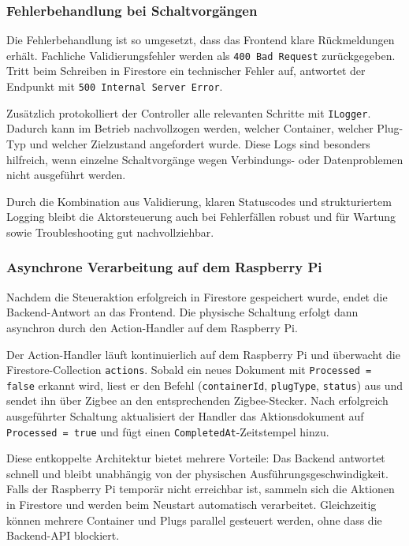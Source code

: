 \subsubsection{Fehlerbehandlung bei Schaltvorgängen}

Die Fehlerbehandlung ist so umgesetzt, dass das Frontend klare Rückmeldungen erhält. Fachliche Validierungsfehler werden als \texttt{400 Bad Request} zurückgegeben. Tritt beim Schreiben in Firestore ein technischer Fehler auf, antwortet der Endpunkt mit \texttt{500 Internal Server Error}.

Zusätzlich protokolliert der Controller alle relevanten Schritte mit \texttt{ILogger}. Dadurch kann im Betrieb nachvollzogen werden, welcher Container, welcher Plug-Typ und welcher Zielzustand angefordert wurde. Diese Logs sind besonders hilfreich, wenn einzelne Schaltvorgänge wegen Verbindungs- oder Datenproblemen nicht ausgeführt werden.

Durch die Kombination aus Validierung, klaren Statuscodes und strukturiertem Logging bleibt die Aktorsteuerung auch bei Fehlerfällen robust und für Wartung sowie Troubleshooting gut nachvollziehbar.

\subsubsection{Asynchrone Verarbeitung auf dem Raspberry Pi}

Nachdem die Steueraktion erfolgreich in Firestore gespeichert wurde, endet die Backend-Antwort an das Frontend. Die physische Schaltung erfolgt dann asynchron durch den Action-Handler auf dem Raspberry Pi.

Der Action-Handler läuft kontinuierlich auf dem Raspberry Pi und überwacht die Firestore-Collection \texttt{actions}. Sobald ein neues Dokument mit \texttt{Processed = false} erkannt wird, liest er den Befehl (\texttt{containerId}, \texttt{plugType}, \texttt{status}) aus und sendet ihn über Zigbee an den entsprechenden Zigbee-Stecker. Nach erfolgreich ausgeführter Schaltung aktualisiert der Handler das Aktionsdokument auf \texttt{Processed = true} und fügt einen \texttt{CompletedAt}-Zeitstempel hinzu.

Diese entkoppelte Architektur bietet mehrere Vorteile: Das Backend antwortet schnell und bleibt unabhängig von der physischen Ausführungsgeschwindigkeit. Falls der Raspberry Pi temporär nicht erreichbar ist, sammeln sich die Aktionen in Firestore und werden beim Neustart automatisch verarbeitet. Gleichzeitig können mehrere Container und Plugs parallel gesteuert werden, ohne dass die Backend-API blockiert.

